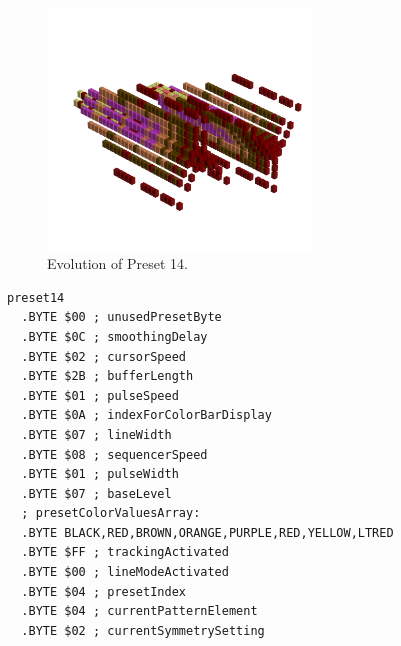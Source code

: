 \begin{minipage}[b]{0.48\linewidth}


                                                                 
\begin{figure}[H]                                                          
  \centering                                                             
  \begin{adjustbox}{width=7cm,center}                                   
  \includegraphics[width=7cm]{src/presets/pattern14-45.png}%
  \end{adjustbox}                                                        
\caption{Evolution of Preset 14.}                                           
\end{figure}                                                               
                                                                 
                                                                           
\end{minipage}
\hspace{0.1cm}
\begin{minipage}[b]{0.48\linewidth}                                       
\begin{lstlisting}[basicstyle=\ttfamily\scriptsize,caption=Data structure for Preset 14.]
preset14
  .BYTE $00 ; unusedPresetByte
  .BYTE $0C ; smoothingDelay
  .BYTE $02 ; cursorSpeed
  .BYTE $2B ; bufferLength
  .BYTE $01 ; pulseSpeed
  .BYTE $0A ; indexForColorBarDisplay
  .BYTE $07 ; lineWidth
  .BYTE $08 ; sequencerSpeed
  .BYTE $01 ; pulseWidth
  .BYTE $07 ; baseLevel
  ; presetColorValuesArray: 
  .BYTE BLACK,RED,BROWN,ORANGE,PURPLE,RED,YELLOW,LTRED
  .BYTE $FF ; trackingActivated
  .BYTE $00 ; lineModeActivated
  .BYTE $04 ; presetIndex
  .BYTE $04 ; currentPatternElement
  .BYTE $02 ; currentSymmetrySetting
\end{lstlisting}
\end{minipage}

